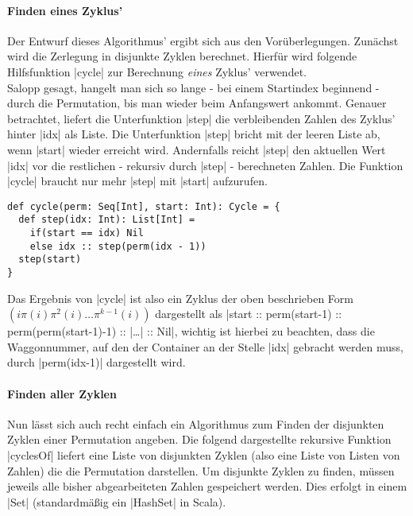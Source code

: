\paragraph{Finden eines Zyklus'}
Der Entwurf dieses Algorithmus' ergibt sich aus den Vorüberlegungen. Zunächst wird die Zerlegung in disjunkte Zyklen berechnet.
Hierfür wird folgende Hilfsfunktion |cycle| zur Berechnung \emph{eines} Zyklus' verwendet.\\
Salopp gesagt, hangelt man sich so lange - bei einem Startindex beginnend - durch die Permutation, bis man wieder beim Anfangswert ankommt.
Genauer betrachtet, liefert die Unterfunktion |step| die verbleibenden Zahlen des Zyklus' hinter |idx| als Liste.
Die Unterfunktion |step| bricht mit der leeren Liste ab, wenn |start| wieder erreicht wird.
Andernfalls reicht |step| den aktuellen Wert |idx| vor die restlichen - rekursiv durch |step| - berechneten Zahlen.
Die Funktion |cycle| braucht nur mehr |step| mit |start| aufzurufen.
\lstset{basicstyle=\ttfamily}
\begin{lstlisting}
def cycle(perm: Seq[Int], start: Int): Cycle = {
  def step(idx: Int): List[Int] =
    if(start == idx) Nil
    else idx :: step(perm(idx - 1))
  step(start)
}
\end{lstlisting}
Das Ergebnis von |cycle| ist also ein Zyklus der oben beschrieben Form $(i \pi(i) \pi^2(i) \dots \pi^{k-1}(i))$ dargestellt
als |start :: perm(start-1) :: perm(perm(start-1)-1) :: |\dots| :: Nil|,
wichtig ist hierbei zu beachten, dass die Waggonnummer, auf den der Container an der Stelle |idx| gebracht werden muss,
 durch |perm(idx-1)| dargestellt wird.
\paragraph{Finden aller Zyklen}
Nun lässt sich auch recht einfach ein Algorithmus zum Finden der disjunkten Zyklen einer Permutation angeben.
Die folgend dargestellte rekursive Funktion |cyclesOf| liefert eine Liste von disjunkten Zyklen (also eine Liste von Listen von Zahlen)
die die Permutation darstellen. Um disjunkte Zyklen zu finden, müssen jeweils alle bisher abgearbeiteten Zahlen gespeichert werden.
Dies erfolgt in einem |Set| (standardmäßig ein |HashSet| in Scala).

